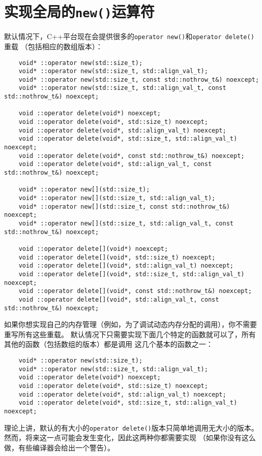 \section{实现全局的\texttt{new()}运算符}\label{ch30.3}
默认情况下，C++平台现在会提供很多的\texttt{operator new()}和\texttt{operator delete()}重载
（包括相应的数组版本）：
\begin{lstlisting}
    void* ::operator new(std::size_t);
    void* ::operator new(std::size_t, std::align_val_t);
    void* ::operator new(std::size_t, const std::nothrow_t&) noexcept;
    void* ::operator new(std::size_t, std::align_val_t, const std::nothrow_t&) noexcept;

    void ::operator delete(void*) noexcept;
    void ::operator delete(void*, std::size_t) noexcept;
    void ::operator delete(void*, std::align_val_t) noexcept;
    void ::operator delete(void*, std::size_t, std::align_val_t) noexcept;
    void ::operator delete(void*, const std::nothrow_t&) noexcept;
    void ::operator delete(void*, std::align_val_t, const std::nothrow_t&) noexcept;

    void* ::operator new[](std::size_t);
    void* ::operator new[](std::size_t, std::align_val_t);
    void* ::operator new[](std::size_t, const std::nothrow_t&) noexcept;
    void* ::operator new[](std::size_t, std::align_val_t, const std::nothrow_t&) noexcept;

    void ::operator delete[](void*) noexcept;
    void ::operator delete[](void*, std::size_t) noexcept;
    void ::operator delete[](void*, std::align_val_t) noexcept;
    void ::operator delete[](void*, std::size_t, std::align_val_t) noexcept;
    void ::operator delete[](void*, const std::nothrow_t&) noexcept;
    void ::operator delete[](void*, std::align_val_t, const std::nothrow_t&) noexcept;
\end{lstlisting}
如果你想实现自己的内存管理（例如，为了调试动态内存分配的调用），你不需要重写所有这些重载。
默认情况下只需要实现下面几个特定的函数就可以了，所有其他的函数（包括数组的版本）都是调用
这几个基本的函数之一：
\begin{lstlisting}
    void* ::operator new(std::size_t);
    void* ::operator new(std::size_t, std::align_val_t);
    void ::operator delete(void*) noexcept;
    void ::operator delete(void*, std::size_t) noexcept;
    void ::operator delete(void*, std::align_val_t) noexcept;
    void ::operator delete(void*, std::size_t, std::align_val_t) noexcept;
\end{lstlisting}
理论上讲，默认的有大小的\texttt{operator delete()}版本只简单地调用无大小的版本。
然而，将来这一点可能会发生变化，因此这两种你都需要实现
（如果你没有这么做，有些编译器会给出一个警告）。

